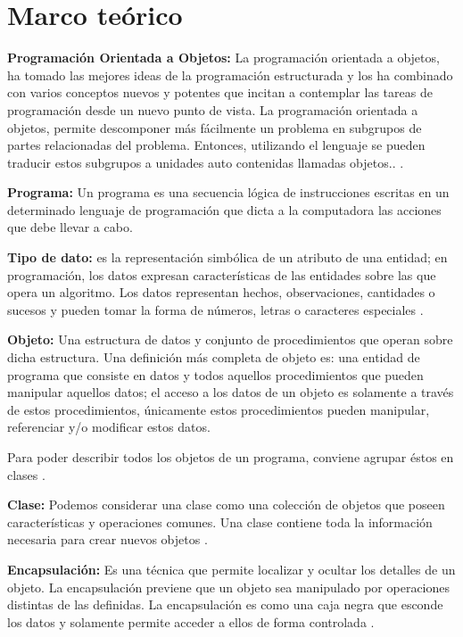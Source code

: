 \chapter{Marco teórico}
\textbf{Programación Orientada a Objetos:} La programación orientada a objetos, ha tomado las mejores ideas de la programación estructurada y los ha combinado con varios conceptos nuevos y potentes que incitan a contemplar las tareas de programación desde un nuevo punto de vista. La programación orientada a objetos, permite descomponer más fácilmente un problema en subgrupos de partes relacionadas del problema. Entonces, utilizando el lenguaje se pueden traducir estos subgrupos a unidades auto contenidas llamadas objetos.. \citep{izquierdo2007introduccion}.

\textbf{Programa:} Un programa es una secuencia lógica de instrucciones escritas en un determinado lenguaje de programación que dicta a la computadora las acciones que debe llevar a cabo.

\textbf{Tipo de dato:} es la representación simbólica de un atributo de una entidad; en programación, los datos expresan características de las entidades sobre las que opera un algoritmo. Los datos representan hechos, observaciones, cantidades o sucesos y pueden tomar la forma de números, letras o caracteres especiales \citep{izquierdo2007introduccion}.

\textbf{Objeto:} Una estructura de datos y conjunto de procedimientos que operan sobre dicha estructura. Una definición más completa de objeto es: una entidad de programa que consiste en datos y todos aquellos procedimientos que pueden manipular aquellos datos; el acceso a los datos de un objeto es solamente a través de estos procedimientos, únicamente estos procedimientos pueden manipular, referenciar y/o modificar estos datos.

Para poder describir todos los objetos de un programa, conviene agrupar éstos en clases \citep{izquierdo2007introduccion}.

\textbf{Clase:} Podemos considerar una clase como una colección de objetos que poseen características y operaciones comunes. Una clase contiene toda la información necesaria para crear nuevos objetos \citep{izquierdo2007introduccion}.

\textbf{Encapsulación:} Es una técnica que permite localizar y ocultar los detalles de un objeto. La encapsulación previene que un objeto sea manipulado por operaciones distintas de las definidas. La encapsulación es como una caja negra que esconde los datos y solamente permite acceder a ellos de forma controlada \citep{izquierdo2007introduccion}.

